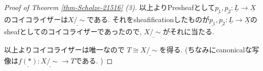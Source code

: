 \documentclass[dvipdfmx,a4paper,11pt]{article}
\theoremstyle{definition}
\newcommand{\xr}[1]{\textcolor{red}{#1}}
\begin{document}
\begin{proof}[Proof of Theorem \ref{thm-Scholze-21516} (3)]
以上よりPresheafとして$\underline{p_1}, \underline{p_2} : \underline{L} \to \underline{X}$のコイコライザーは$\underline{X/\sim}$である.
それをsheafificationしたものが$\underline{p_1}, \underline{p_2} : \underline{L} \to \underline{X}$のsheafとしてのコイコライザーであったので, $\underline{X/\sim}$がそれに当たる.

以上よりコイコライザーは唯一なので
$T \cong \underline{X/\sim}$を得る. 
(ちなみにcanonicalな写像は$\underline{f(\ast)} : \underline{X/\sim} \to T$である. )

\begin{comment}

$T$は$f,f \underline{X} \times_{T} \underline{X} \to \underline{X}$のコイコライザーであることを示す. 
まず$T$はPresheafとしてのコイコライザーである. 

なぜならば$f : X \to Y$を集合の全射としたら
$X \times_Y X = \{ (x,y) \in X \times Y | f(x)=f(y)\}$である.
よって
$X \times_Y X  \to X$のコイコライザーは
$$
X \sqcup X / \sim \quad
(x,1) \sim (y, 2) \Leftrightarrow f(x)=f(y)
$$
となる.
$$
X \sqcup X / \sim \to Y \quad (x , i) \mapsto f(x)
$$
を考えるとこれは全射である. 
単射については
$f(x , 1) = f(y,2)$ならば$f(x) = f(y)$より良い
$f(x , 1) = f(y,1)$ならば$(y,1) \sim (y,2)$より上に帰着できる. 

$T$はsheafであるので, $f,f \underline{X} \times_{T} \underline{X} \to \underline{X}$のsheafとしてのコイコライザーになる. 

一方で$L:=\{ (x,y) \in X \times X | f(\ast)(x) = f(\ast)(y)\}$に$X \times X$の部分位相を入れたものを考えると
\begin{equation*}
\xymatrix@C=80pt@R=30pt{
L \ar@{->}[r]
\ar@{->}[d]
& X\ar@{->>}[d]^{f}
\\
X\ar@{->>}[r]_{f}
& X/\sim
 \\   
}
\end{equation*}
もコイコライザーである . 
$X \mapsto \underline{X}$は

$G$がessentially surjectiveを示す. これは[2]のように$X, f, L$をとる.
つまり次の図式を得る.  左は直積なので右も直積となる.
\begin{equation*}
\xymatrix@C=80pt@R=30pt{
\underline{L}\ar@{->}[r]
\ar@{->}[d]
&\underline{X}\ar@{->}[d]^{f}
&L \ar@{->}[r]_{p_1}
\ar@{->}[d]_{p_2}
& X \ar@{->}[d]^{f(\ast)}
\\
\underline{X}\ar@{->}[r]_{f}
&T
&X \ar@{->}[r]_{f(\ast)}
&T(\ast)_{top} \cong X/\sim
 \\   
}
\end{equation*}
かつ$L = \{ (x,y) \in X \times X | f(\ast)(x) = f(\ast)(y)\}$となる. 
よって$T \cong \underline{X/\sim}$を示せば良い. 

ここで$\rho : T \to \underline{X/\sim}$を$S \in {\bf ED}$について
$T(S) \to \underline{X/\sim}(S) = hom(S, T(\ast)_{top})$は$f \mapsto f(\ast)$で与えられる. 
よって$T(S) \cong coeq(\underline{L}(S) \to \underline{X}(S)) \cong   \underline{X/\sim}(S)$なので
$T \cong \underline{X/\sim}$である \xr{ちょっとここ怪しいのでもう一回見る}
\xr{ちょっとここは自信ないのでもうちょい詳しく(自然な同型かを見る必要がある.)}
\end{comment}
\end{proof}
\end{document}
